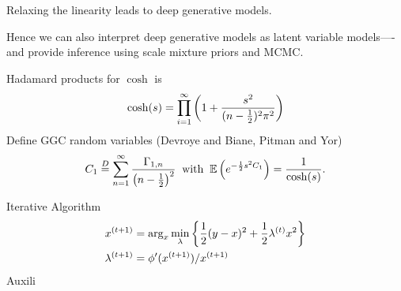 \documentclass[11pt]{article}%
\begin{document}
Relaxing the linearity leads to deep generative models.

Hence we can also interpret deep generative models as latent variable models----and provide inference using scale mixture priors and MCMC.

Hadamard products for $ \cosh $ is 
$$
\cosh (s) = \prod_{i=1}^\infty \left ( 1 + \frac{s^2}{(n-\frac{1}{2})^2 \pi^2} \right )
$$
Define GGC random variables (Devroye and Biane, Pitman and Yor)
$$
C_1  \stackrel{D}{=}  \sum_{n=1}^\infty \frac{ \Gamma_{1,n} }{ \left ( n - \frac{1}{2} \right )^2 }  \; \; {\rm with} \; \; \mathbb{E} \left ( e^{ - \frac{1}{2} s^2 C_1 } \right ) = \frac{1}{ \cosh  (s) } .
$$

Iterative Algorithm
\begin{align*}
x^{(t+1)} &= \arg_x \min_\lambda \left\{ \frac{1}{2} ( y-x )^2 + \frac{1}{2} \lambda^{(t)}  x^2 \right \}  \\
\lambda^{(t+1)} &=  \phi^\prime ( x^{(t+1)} ) / x^{(t+1)} \\
\end{align*}
Auxili




\end{document}
